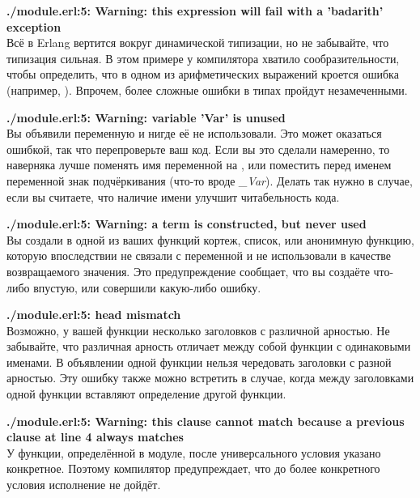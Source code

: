 \blankline
\begin{minipage}{\textwidth}
\textbf{./module.erl:5: Warning: this expression will fail with a 'badarith' exception}\\
Всё в Erlang вертится вокруг динамической типизации, но не забывайте, что типизация сильная. В этом примере у компилятора хватило сообразительности, чтобы определить, что в одном из арифметических выражений кроется ошибка (например, ). Впрочем, более сложные ошибки в типах пройдут незамеченными.
\end{minipage}

\blankline
\begin{minipage}{\textwidth}
    \textbf{./module.erl:5: Warning: variable 'Var' is unused}\\
    Вы объявили переменную и нигде её не использовали. Это может оказаться ошибкой, так что перепроверьте ваш код. Если вы это сделали намеренно, то наверняка лучше поменять имя переменной на \ops{\strut{\_}}, или поместить перед именем переменной знак подчёркивания (что\--то вроде \emph{\_Var}). Делать так нужно в случае, если вы считаете, что наличие имени улучшит читабельность кода.
\end{minipage}

\blankline
\begin{minipage}{\textwidth}
    \textbf{./module.erl:5: Warning: a term is constructed, but never used}\\
    Вы создали в одной из ваших функций кортеж, список, или анонимную функцию, которую впоследствии не связали с переменной и не использовали в качестве возвращаемого значения. Это предупреждение сообщает, что вы создаёте что\--либо впустую, или совершили какую\--либо ошибку.
\end{minipage}

\blankline
\begin{minipage}{\textwidth}
    \textbf{./module.erl:5: head mismatch}\\
    Возможно, у вашей функции несколько заголовков с различной арностью. Не забывайте, что различная арность отличает между собой функции с одинаковыми именами. В объявлении одной функции нельзя чередовать заголовки с разной арностью. Эту ошибку также можно встретить в случае, когда между заголовками одной функции вставляют определение другой функции.
\end{minipage}

\blankline
\begin{minipage}{\textwidth}
    \textbf{./module.erl:5: Warning: this clause cannot match because a previous clause at line 4 always matches}\\
    У функции, определённой в модуле, после универсального условия указано конкретное. Поэтому компилятор предупреждает, что до более конкретного условия исполнение не дойдёт.
\end{minipage}

